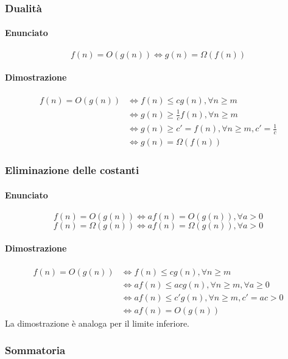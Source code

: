 \subsubsection{Dualit\`a}
\paragraph{Enunciato}
\begin{equation*}
f(n)=O(g(n))\Leftrightarrow g(n)=\Omega(f(n))
\end{equation*}
\paragraph{Dimostrazione}
\begin{align*}
f(n)=O(g(n))&\Leftrightarrow f(n)\le cg(n),\forall n\ge m\\
&\Leftrightarrow g(n)\ge \frac{1}{c}f(n), \forall n\ge m\\
&\Leftrightarrow g(n)\ge c'=f(n),\forall n\ge m, c'=\frac{1}{c}\\
&\Leftrightarrow g(n)=\Omega(f(n))
\end{align*}
\subsubsection{Eliminazione delle costanti}
\paragraph{Enunciato}
\begin{equation}
f(n)=O(g(n))\Leftrightarrow af(n)=O(g(n)),\forall a>0
\end{equation}
\begin{equation}
f(n)=\Omega(g(n))\Leftrightarrow af(n)=\Omega(g(n)),\forall a>0
\end{equation}
\paragraph{Dimostrazione}
\begin{align*}
f(n)=O(g(n))&\Leftrightarrow f(n)\le cg(n),\forall n\ge m\\
&\Leftrightarrow af(n)\le acg(n),\forall n\ge m,\forall a\ge 0\\
&\Leftrightarrow af(n)\le c'g(n),\forall n\ge m,c'=ac>0\\
&\Leftrightarrow af(n)=O(g(n))
\end{align*}
La dimostrazione \`e analoga per il limite inferiore.
\subsubsection{Sommatoria}
